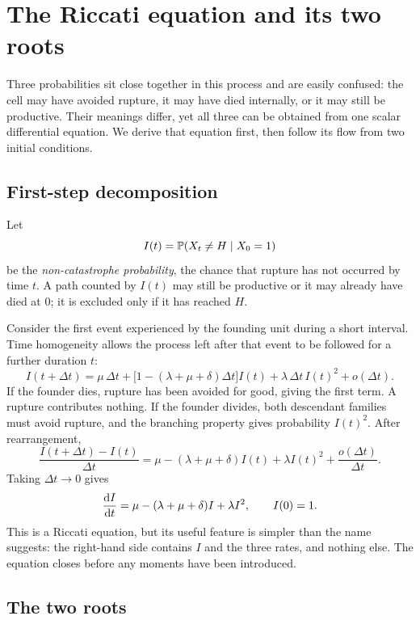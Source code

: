 \section{The Riccati equation and its two roots}
\label{bdc:sec:riccati}

Three probabilities sit close together in this process and are easily confused:
the cell may have avoided rupture, it may have died internally, or it may still
be productive. Their meanings differ, yet all three can be obtained from one
scalar differential equation. We derive that equation first, then follow its
flow from two initial conditions.

\subsection{First-step decomposition}
\label{bdc:sec:firststep}

Let
\[
I(t)=\mathbb{P}\!\left(X_t\neq H \mid X_0=1\right)
\]
be the \emph{non-catastrophe probability}, the chance that rupture has not
occurred by time $t$. A path counted by $I(t)$ may still be productive or it may
already have died at $0$; it is excluded only if it has reached $H$.

Consider the first event experienced by the founding unit during a short
interval. Time homogeneity allows the process left after that event to be
followed for a further duration $t$:
\[
I(t+\Delta t) = \mu\,\Delta t
+ \bigl[1-(\lambda+\mu+\delta)\Delta t\bigr]I(t)
+ \lambda\,\Delta t\,I(t)^2 + o(\Delta t).
\]
If the founder dies, rupture has been avoided for good, giving the first term.
A rupture contributes nothing. If the founder divides, both descendant families
must avoid rupture, and the branching property gives probability $I(t)^2$.
After rearrangement,
\[
\frac{I(t+\Delta t)-I(t)}{\Delta t}
= \mu - (\lambda+\mu+\delta)I(t) + \lambda I(t)^2
+ \frac{o(\Delta t)}{\Delta t}.
\]
Taking $\Delta t\to0$ gives
\begin{equation}
\label{bdc:eq:riccati}
\frac{\mathrm{d} I}{\mathrm{d} t} = \mu - (\lambda+\mu+\delta)I + \lambda I^2,
\qquad I(0)=1.
\end{equation}
This is a Riccati equation, but its useful feature is simpler than the name
suggests: the right-hand side contains $I$ and the three rates, and nothing else.
The equation closes before any moments have been introduced.

\subsection{The two roots}
\label{bdc:sec:roots}

